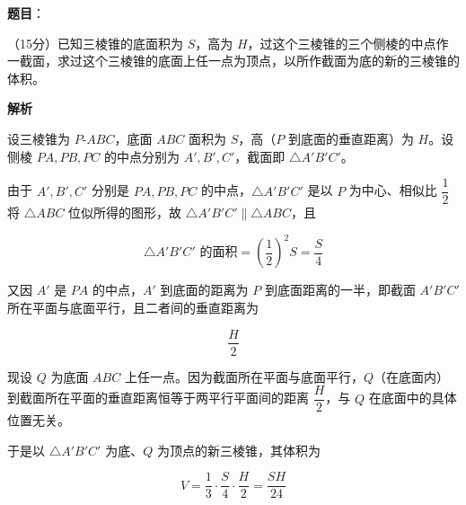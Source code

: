 \begin{answer}

\textbf{题目}：

（15分）已知三棱锥的底面积为 $S$，高为 $H$，过这个三棱锥的三个侧棱的中点作一截面，求过这个三棱锥的底面上任一点为顶点，以所作截面为底的新的三棱锥的体积。

\textbf{解析}

设三棱锥为 $P\text{-}ABC$，底面 $ABC$ 面积为 $S$，高（$P$ 到底面的垂直距离）为 $H$。设侧棱 $PA,PB,PC$ 的中点分别为 $A',B',C'$，截面即 $\triangle A'B'C'$。

由于 $A',B',C'$ 分别是 $PA,PB,PC$ 的中点，$\triangle A'B'C'$ 是以 $P$ 为中心、相似比 $\dfrac12$ 将 $\triangle ABC$ 位似所得的图形，故 $\triangle A'B'C'\parallel\triangle ABC$，且

\nopagebreak[4]
\[
\triangle A'B'C'\text{ 的面积}=\left(\frac12\right)^2S=\frac S4
\]

又因 $A'$ 是 $PA$ 的中点，$A'$ 到底面的距离为 $P$ 到底面距离的一半，即截面 $A'B'C'$ 所在平面与底面平行，且二者间的垂直距离为

\nopagebreak[4]
\[
\frac H2
\]

现设 $Q$ 为底面 $ABC$ 上任一点。因为截面所在平面与底面平行，$Q$（在底面内）到截面所在平面的垂直距离恒等于两平行平面间的距离 $\dfrac H2$，与 $Q$ 在底面中的具体位置无关。

于是以 $\triangle A'B'C'$ 为底、$Q$ 为顶点的新三棱锥，其体积为

\nopagebreak[4]
\[
V=\frac13\cdot\frac S4\cdot\frac H2=\frac{SH}{24}
\]


\end{answer}
